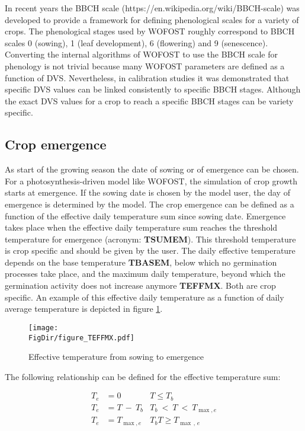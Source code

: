 In recent years the BBCH scale (https://en.wikipedia.org/wiki/BBCH-scale) was developed to provide 
a framework for defining phenological scales for a variety of crops. The phenological stages
used by WOFOST roughly correspond to BBCH scales 0 (sowing), 1 (leaf development), 6 (flowering)
and 9 (senescence). Converting the internal algorithms of WOFOST to use the BBCH scale for phenology is 
not trivial because many WOFOST parameters are defined as a function of DVS. Nevertheless,
in calibration studies it was demonstrated that specific DVS values can be linked consistently
to specific BBCH stages. Although the exact DVS values for a crop to reach a specific BBCH
stages can be variety specific.


\subsection{Crop emergence}

As start of the growing season the date of sowing or of emergence can be chosen. For a
photosynthesis-driven model like WOFOST, the simulation of crop growth starts at
emergence. If the sowing date is chosen by the model user, the day of emergence is
determined by the model. The crop emergence can be
defined as a function of the effective daily temperature sum since sowing date. Emergence
takes place when the effective daily temperature sum reaches the threshold temperature
for emergence (acronym: {\bf TSUMEM}). This threshold temperature is crop specific and
should be given by the user. The daily effective temperature depends on the base
temperature {\bf TBASEM}, below which no germination processes take place, and the maximum daily
temperature, beyond which the germination activity does not increase anymore {\bf TEFFMX}.
Both are crop specific. An example of this effective daily temperature as a function of daily
average temperature is depicted in figure \ref{fig:TEFFMAX}.

\begin{figure}[p]
	\centering
	\texttt{[image: \\FigDir/figure\_TEFFMX.pdf]}
	\caption{Effective temperature from sowing to emergence} 
	\label{fig:TEFFMAX}
\end{figure}

The following relationship can be defined for the effective temperature sum:

\begin{align}
T_{e} &= 0            & T \le T _{b} \nonumber  \\
T_{e} &= T~-~ T _{b}  & T _{b} ~<~T ~ < ~T _{\max ,e} \nonumber  \\
T_{e} &= T _{\max ,e} & T _{b} T \ge  T _{\max \, ,\, e}
\end{align}

